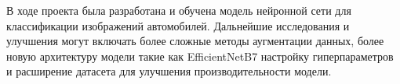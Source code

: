 \documentclass[14pt]{extarticle}
\begin{document}
В ходе проекта была разработана и обучена модель нейронной сети для классификации изображений автомобилей. Дальнейшие
исследования и улучшения могут включать более сложные методы аугментации данных, более новую архитектуру модели такие
как EfficientNet\foreignlanguage{english}{B}7 настройку гиперпараметров и расширение датасета для улучшения
производительности модели.
\newpage
\nocite{*} %
\printbibliography[title={Список использованных источников}] %
\end{document}
